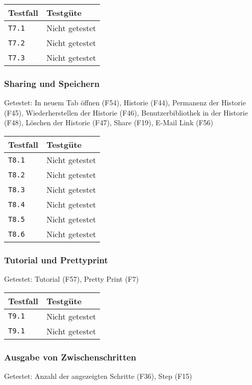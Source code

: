 \documentclass[parskip=full,11pt,twoside]{scrartcl}
\newcommand{\testline}[2]{
    \texttt{#1} & 
    \ifthenelse{\equal{#2}{Nicht getestet}}
        {\cellcolor{red!20}}
        {}
    \ifthenelse{\equal{#2}{Manuell getestet}}
        {\cellcolor{orange!20}}
        {}
    \ifthenelse{\equal{#2}{Automatisiert getestet}}
        {\cellcolor{green!20}}
        {}
    #2 \\ \hline
}
\begin{document}
    \label{shortcuts}
    \begin{center}
        \begin{tabular}{ p{9cm} p{4cm}}
            Testfall & Testgüte \\ \hline
            \testline{T7.1}{Nicht getestet}
            \testline{T7.2}{Nicht getestet}
            \testline{T7.3}{Nicht getestet}
        \end{tabular}
    \end{center}

\subsubsection{Sharing und Speichern}
    Getestet:
    In neuem Tab öffnen (F54),
    Historie (F44),
    Permanenz der Historie (F45),
    Wiederherstellen der Historie (F46),
    Benutzerbibliothek in der Historie (F48),
    Löschen der Historie (F47),
    Share (F19),
    E-Mail Link (F56)

    \label{shortcuts}
    \begin{center}
        \begin{tabular}{ p{9cm} p{4cm}}
            Testfall & Testgüte \\ \hline
            \testline{T8.1}{Nicht getestet}
            \testline{T8.2}{Nicht getestet}
            \testline{T8.3}{Nicht getestet}
            \testline{T8.4}{Nicht getestet}
            \testline{T8.5}{Nicht getestet}
            \testline{T8.6}{Nicht getestet}
        \end{tabular}
    \end{center}

\subsubsection{Tutorial und Prettyprint}
    Getestet:
    Tutorial (F57),
    Pretty Print (F7)

    \label{shortcuts}
    \begin{center}
        \begin{tabular}{ p{9cm} p{4cm}}
            Testfall & Testgüte \\ \hline
            \testline{T9.1}{Nicht getestet}
            \testline{T9.1}{Nicht getestet}
        \end{tabular}
    \end{center}

\subsubsection{Ausgabe von Zwischenschritten}
    Getestet:
    Anzahl der angezeigten Schritte (F36),
    Step (F15)
\end{document}
